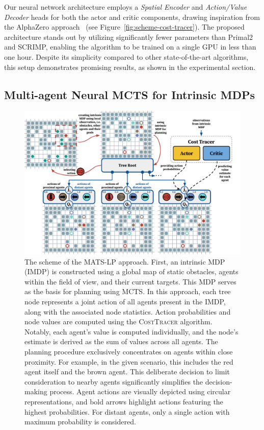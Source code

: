\documentclass[letterpaper]{article} %
\begin{document}
Our neural network architecture employs a \textit{Spatial Encoder} and \textit{Action/Value Decoder} heads for both the actor and critic components, drawing inspiration from the AlphaZero approach~\cite{silver2017mastering} (see Figure~\ref{fig:scheme-cost-tracer}). The proposed architecture stands out by utilizing significantly fewer parameters than Primal2 and SCRIMP, enabling the algorithm to be trained on a single GPU in less than one hour.
Despite its simplicity compared to other state-of-the-art algorithms, this setup demonstrates promising results, as shown in the experimental section.

\subsection{Multi-agent Neural MCTS for Intrinsic MDPs}

\begin{figure}[ht!]
    \centering
    \includegraphics[width=1.0\textwidth]{figures/03-main-scheme.pdf}
    \caption{
The scheme of the \textsc{MATS-LP} approach. First, an intrinsic MDP (IMDP) is constructed using a global map of static obstacles, agents within the field of view, and their current targets. This MDP serves as the basis for planning using MCTS. In this approach, each tree node represents a joint action of all agents present in the IMDP, along with the associated node statistics. Action probabilities and node values are computed using the \textsc{CostTracer} algorithm. Notably, each agent's value is computed individually, and the node's estimate is derived as the sum of values across all agents.
The planning procedure exclusively concentrates on agents within close proximity. For example, in the given scenario, this includes the red agent itself and the brown agent. This deliberate decision to limit consideration to nearby agents significantly simplifies the decision-making process. Agent actions are visually depicted using circular representations, and bold arrows highlight actions featuring the highest probabilities. For distant agents, only a single action with maximum probability is considered.
}
    \label{fig:mmcts}

\end{figure}
\end{document}

